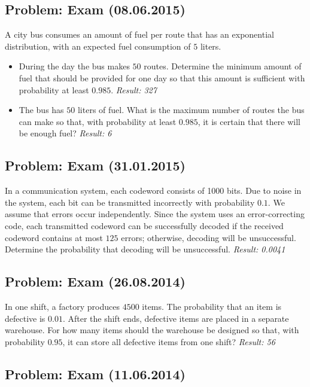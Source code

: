 \documentclass[a4paper, 12pt]{article}
\begin{document}
\subsection{Problem: Exam (08.06.2015)}

A city bus consumes an amount of fuel per route that has an exponential distribution, with an expected fuel consumption of $5$ liters.
\begin{itemize}
  \item [a)] During the day the bus makes $50$ routes. Determine the minimum amount of fuel that should be provided for one day so that this amount is sufficient with probability at least $0.985$.
\textit{Result: {327}}

\item [b)] The bus has $50$ liters of fuel. What is the maximum number of routes the bus can make so that, with probability at least $0.985$, it is certain that there will be enough fuel?
\textit{Result: {6}}

\end{itemize}



\subsection{Problem: Exam (31.01.2015)}
In a communication system, each codeword consists of 1000 bits. Due to noise in the system, each bit can be transmitted incorrectly with probability $0.1$. We assume that errors occur independently. Since the system uses an error-correcting code, each transmitted codeword can be successfully decoded if the received codeword contains at most $125$ errors; otherwise, decoding will be unsuccessful. Determine the probability that decoding will be unsuccessful.
\textit{Result: {0.0041}}

\subsection{Problem: Exam (26.08.2014)}

In one shift, a factory produces $4500$ items. The probability that an item is defective is $0.01$. After the shift ends, defective items are placed in a separate warehouse. For how many items should the warehouse be designed so that, with probability $0.95$, it can store all defective items from one shift?
\textit{Result: {56}}

\subsection{Problem: Exam (11.06.2014)}
\end{document}
